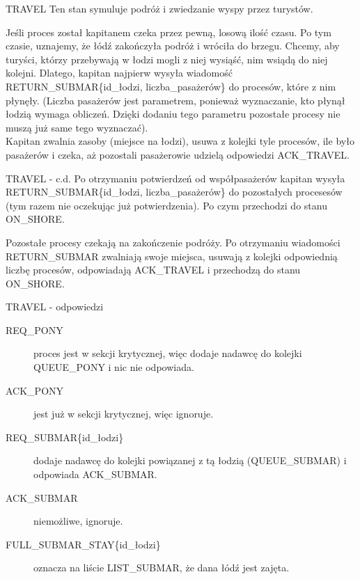 \documentclass{beamer}
\begin{document}
\begin{frame}{TRAVEL}
    \internallinenumbers
    \resetlinenumber[1]
    Ten stan symuluje podróż i zwiedzanie wyspy przez turystów.

    \vspace{0.4cm}
    Jeśli proces został kapitanem czeka przez pewną, losową ilość czasu. Po tym czasie, uznajemy, że łódź zakończyła podróż i wróciła do brzegu. Chcemy, aby turyści, którzy przebywają w łodzi mogli z niej wysiąść, nim wsiądą do niej kolejni. Dlatego, kapitan najpierw wysyła wiadomość RETURN\_SUBMAR\{id\_łodzi, liczba\_pasażerów\} do procesów, które z nim płynęły. (Liczba pasażerów jest parametrem, ponieważ wyznaczanie, kto płynął łodzią wymaga obliczeń. Dzięki dodaniu tego parametru pozostałe procesy nie muszą już same tego wyznaczać). \\
    Kapitan zwalnia zasoby (miejsce na łodzi), usuwa z kolejki tyle procesów, ile było pasażerów i czeka, aż pozostali pasażerowie udzielą odpowiedzi ACK\_TRAVEL.
\end{frame}

\begin{frame}{TRAVEL - c.d.}
    \internallinenumbers
    \resetlinenumber[1]
    Po otrzymaniu potwierdzeń od współpasażerów kapitan wysyła RETURN\_SUBMAR\{id\_łodzi, liczba\_pasażerów\} do pozostałych procesesów (tym razem nie oczekując już potwierdzenia). Po czym przechodzi do stanu ON\_SHORE.

    \vspace{0.4cm}
    Pozostałe procesy czekają na zakończenie podróży. Po otrzymaniu wiadomości RETURN\_SUBMAR zwalniają swoje miejsca, usuwają z kolejki odpowiednią liczbę procesów, odpowiadają ACK\_TRAVEL i przechodzą do stanu ON\_SHORE.
\end{frame}

\begin{frame}{TRAVEL - odpowiedzi}
    \internallinenumbers
    \resetlinenumber[1]
    \begin{description}
        \item [REQ\_PONY] proces jest w sekcji krytycznej, więc dodaje nadawcę do kolejki QUEUE\_PONY i nic nie odpowiada. 
        \item [ACK\_PONY] jest już w sekcji krytycznej, więc ignoruje.
        \item [REQ\_SUBMAR\{id\_łodzi\}] dodaje nadawcę do kolejki powiązanej z tą łodzią (QUEUE\_SUBMAR) i odpowiada ACK\_SUBMAR.
        \item [ACK\_SUBMAR] niemożliwe, ignoruje.
        \item [FULL\_SUBMAR\_STAY\{id\_łodzi\}] oznacza na liście LIST\_SUBMAR, że dana łódź jest zajęta.
    \end{description}
\end{frame}
\end{document}
